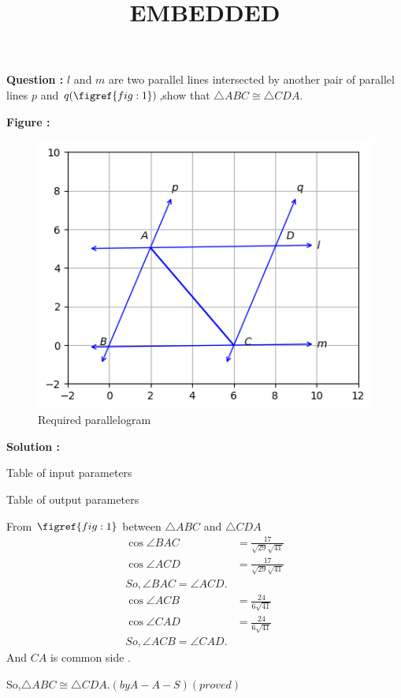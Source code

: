 \documentclass[12pt]{article}
\providecommand{\brak}[1]{\ensuremath{\left(#1\right)}}
\begin{document}
\title{\textbf{EMBEDDED}}
\date{}
\maketitle
\textbf{Question :} $l$ and $m$ are two parallel lines intersected by another pair of parallel lines $p$ and $q (\figref{fig:1})$,show that $\triangle ABC \cong \triangle CDA$.

\textbf{Figure :}
\begin{figure}[H]
    \centering
    \includegraphics{fig/em1.png}
    \caption{Required parallelogram}
    \label{fig:fig:1}
\end{figure}

\textbf{Solution :}
\begin{table}[H]
    \centering
    
    \caption{Table of input parameters}
    \label{tab:tab:1}
\end{table}

\begin{table}[H]
    \centering
    
    \caption{Table of output parameters}
    \label{tab:tab:2}
\end{table}  
From $\figref{fig:1}$ between $\triangle ABC $ and $\triangle CDA$
\begin{align}
\cos{\angle BAC} &=\frac{17}{\sqrt{29}\sqrt{41}}\\
\cos{\angle ACD} &=\frac{17}{\sqrt{29}\sqrt{41}}\\
So,\angle BAC = \angle ACD.\\
\cos{\angle ACB} &=\frac{24}{6\sqrt{41}}\\
\cos{\angle} CAD &=\frac{24}{6\sqrt{41}}\\
So,\angle ACB = \angle CAD.
\end{align}
And $CA$ is common side .

So,$\triangle ABC \cong \triangle CDA.\brak{by A-A-S}\brak{proved}$
\end{document}
